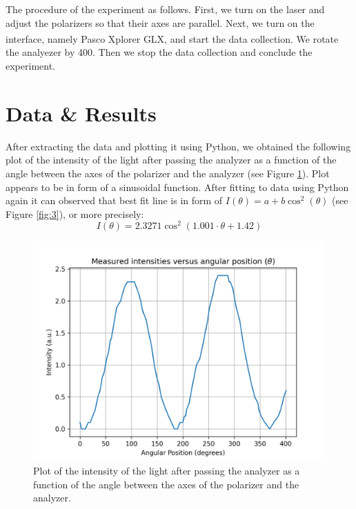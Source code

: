 \documentclass[10pt]{article}
\begin{document}
The procedure of the experiment as follows. First, we turn on the laser and adjust the polarizers so that their axes are parallel. Next, we turn on the interface, namely Pasco\textsuperscript{\textregistered} Xplorer GLX, and start the data collection. We rotate the analyezer by 400\degree. Then we stop the data collection and conclude the experiment.

\section{Data \& Results}
After extracting the data and plotting it using Python, we obtained the following plot of the intensity of the light after passing the analyzer as a function of the angle between the axes of the polarizer and the analyzer (see Figure \ref{fig:2}).
Plot appears to be in form of a sinusoidal function. After fitting to data using Python again it can observed that best fit line is in form of $I(\theta) = a + b\cos^2(\theta)$ (see Figure \ref{fig:3}), or more precisely:
\begin{equation}
  I(\theta) = 2.3271\cos^2(1.001\cdot\theta+1.42)
  \label{eq:2}
\end{equation}
\begin{figure}[ht]
  \centering
  \includegraphics[scale=0.6]{plots/plot1.png}
  \caption{Plot of the intensity of the light after passing the analyzer as a function of the angle between the axes of the polarizer and the analyzer.}
  \label{fig:2}
\end{figure}
\end{document}
